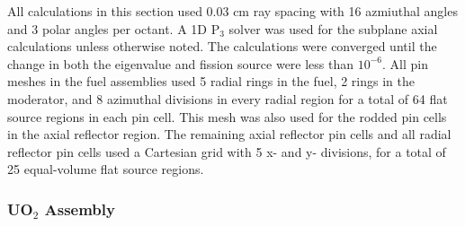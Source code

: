 All calculations in this section used 0.03 cm ray spacing with 16 azmiuthal angles and 3 polar angles per octant.  A 1D P$_3$ solver was used for the subplane axial calculations unless otherwise noted.  The calculations were converged until the change in both the eigenvalue and fission source were less than $10^{-6}$.  All pin meshes in the fuel assemblies used 5 radial rings in the fuel, 2 rings in the moderator, and 8 azimuthal divisions in every radial region for a total of 64 flat source regions in each pin cell.  This mesh was also used for the rodded pin cells in the axial reflector region.  The remaining axial reflector pin cells and all radial reflector pin cells used a Cartesian grid with 5 x- and y- divisions, for a total of 25 equal-volume flat source regions.

\subsubsection{UO\texorpdfstring{$_2$}{2} Assembly}\label{sss:results-2d-assem}

